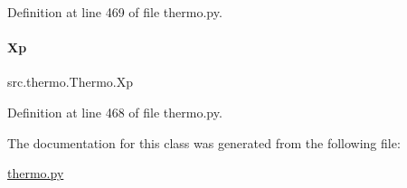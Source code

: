 Definition at line 469 of file thermo.\+py.

\mbox{\label{classsrc_1_1thermo_1_1Thermo_af0cdfb1c8688ee0d65b87abac5e0dfef}} 
\paragraph{\texorpdfstring{Xp}{Xp}}
{\footnotesize\ttfamily src.\+thermo.\+Thermo.\+Xp}



Definition at line 468 of file thermo.\+py.



The documentation for this class was generated from the following file\+:\begin{DoxyCompactItemize}
\item 
\hyperlink{thermo_8py}{thermo.\+py}\end{DoxyCompactItemize}
